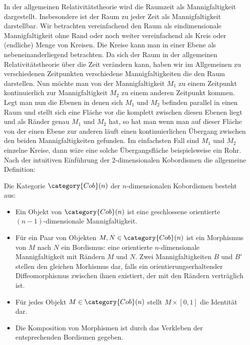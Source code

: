 



In der allgemeinen Relativitätstheorie wird die Raumzeit als Mannigfaltigkeit dargestellt.
Insbesondere ist der Raum zu jeder Zeit als Mannigfaltigkeit darstellbar. Wir betrachten vereinfachend
den Raum als eindimensionale Mannigfaltigkeit ohne Rand oder noch weiter vereinfachend als Kreis oder (endliche)
Menge von Kreisen. Die Kreise kann man in einer Ebene als nebeneinanderliegend betrachten. Da sich der Raum in der
allgemeinen Relativitätstheorie über die Zeit verändern kann, haben wir im Allgemeinen zu verschiedenen Zeitpunkten
verschiedene Mannigfaltigkeiten die den Raum darstellen. Nun möchte man von der Mannigfaltigkeit $M_1$ zu einem Zeitpunkt
kontinuierlich zur Mannigfaltigkeit $M_2$ zu einem anderen Zeitpunkt kommen.
Legt man nun die Ebenen in denen sich $M_1$ und $M_2$ befinden parallel in einen Raum und stellt sich eine Fläche vor die
komplett zwischen diesen Ebenen liegt und als Ränder genau $M_1$ und $M_2$ hat, so hat man wenn man auf dieser Fläche
von der einen Ebene zur anderen läuft einen kontinuierlichen Übergang zwischen den beiden Mannigfaltigkeiten gefunden.
Im einfachsten Fall sind $M_1$ und $M_2$ einzelne Kreise, dann wäre eine solche Übergangsfläche beispielsweise ein Rohr.
Nach der intuitiven Einführung der 2-dimensionalen Kobordismen die allgemeine Definition:

\begin{Def}
  Die Kategorie $\category{Cob}(n)$ der $n$-dimensionalen Kobordismen besteht aus:
  \begin{itemize}
    \item Ein Objekt von $\category{Cob}(n)$ ist eine geschlossene orientierte $(n-1)$-dimensionale Mannigfaltigkeit.
    \item Für ein Paar von Objekten $M,N \in \category{Cob}(n)$ ist ein Morphismus von $M$ nach $N$ ein Bordismus:
    eine orientierte $n$-dimensionale Mannigfaltigkeit mit Rändern $M$ und $N$. Zwei Mannigfaltigkeiten $B$ und $B'$ stellen den gleichen Morhismus dar,
    falls ein orientierungserhaltender Diffeomorphismus zwischen ihnen existiert, der mit den Rändern verträglich ist.
    \item Für jedes Objekt $M \in \category{Cob}(n)$ stellt $M \times [0,1]$ die Identität dar.
    \item Die Komposition von Morphismen ist durch das Verkleben der entsprechenden Bordismen gegeben.
  \end{itemize}
\end{Def}


